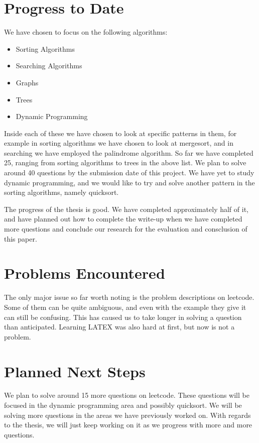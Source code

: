 \documentclass{article}
\begin{document}
\section{Progress to Date}
We have chosen to focus on the following algorithms:
\begin{itemize}
\item Sorting Algorithms
\item Searching Algorithms
\item Graphs
\item Trees
\item Dynamic Programming
\end{itemize}
Inside each of these we have chosen to look at specific patterns in them, for example in sorting algorithms we have chosen to look at mergesort, and in searching we have employed the palindrome algorithm. 
So far we have completed 25, ranging from sorting algorithms to trees in the above list. We plan to solve around 40 questions by the submission date of this project. We have yet to study dynamic programming, and we would like to try and solve another pattern in the sorting algorithms, namely quicksort. 
\par The progress of the thesis is good. We have completed approximately half of it, and have planned out how to complete the write-up when we have completed more questions and conclude our research for the evaluation and consclusion of this paper. 
\section{Problems Encountered}
The only major issue so far worth noting is the problem descriptions on leetcode. Some of them can be quite ambiguous, and even with the example they give it can still be confusing. This has caused us to take longer in solving a question than anticipated. 
Learning LATEX was also hard at first, but now is not a problem.
  
\section{Planned Next Steps}
We plan to solve around 15 more questions on leetcode. These questions will be focused in the dynamic programming area and possibly quicksort. We will be solving more questions in the areas we have previously worked on. 
With regards to the thesis, we will just keep working on it as we progress with more and more questions. 
\end{document}
